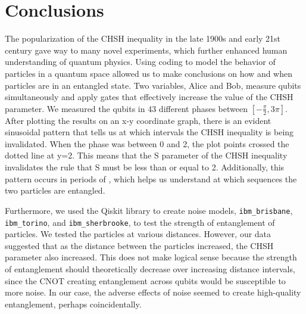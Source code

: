 \documentclass{article}
\begin{document}
\section{Conclusions}

The popularization of the CHSH inequality in the late 1900s and early 21st century gave way to many novel experiments, which further enhanced human understanding of quantum physics. Using coding to model the behavior of particles in a quantum space allowed us to make conclusions on how and when particles are in an entangled state. Two variables, Alice and Bob, measure qubits simultaneously and apply gates that effectively increase the value of the CHSH parameter. We measured the qubits in 43 different phases between $[-\frac\pi2, 3\pi]$. After plotting the results on an x-y coordinate graph, there is an evident sinusoidal pattern that tells us at which intervals the CHSH inequality is being invalidated. When the phase was between 0 and 2, the plot points crossed the dotted line at y=2. This means that the S parameter of the CHSH inequality invalidates the rule that S must be less than or equal to 2. Additionally, this pattern occurs in periods of , which helps us understand at which sequences the two particles are entangled. 

Furthermore, we used the Qiskit library to create noise models, \verb|ibm_brisbane|, \verb|ibm_torino|, and \verb|ibm_sherbrooke|, to test the strength of entanglement of particles. We tested the particles at various distances. However, our data suggested that as the distance between the particles increased, the CHSH parameter also increased. This does not make logical sense because the strength of entanglement should theoretically decrease over increasing distance intervals, since the CNOT creating entanglement across qubits would be susceptible to more noise. In our case, the adverse effects of noise seemed to create high-quality entanglement, perhaps coincidentally. 



\newpage

\end{document}
